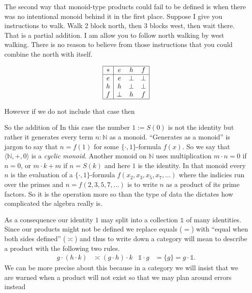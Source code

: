 \documentclass[12pt,twoside,letterpaper]{memoir}
\newcommand{\one}{\mathds{1}}
\begin{document}
The second way that monoid-type products could fail to be defined is when there 
was no intentional monoid behind it in the first place.  Suppose I give you instructions to walk.  Walk 2 block north, then 3 blocks west, then wait there.
That is a partial addition.  I am allow you to follow north walking by west walking.  There is no reason to believe from those instructions that you 
could combine the north with itself.


\begin{equation}
    \begin{array}{|c|ccc|}
        \hline 
        * & e & h & f\\
        \hline 
        e & e & \bot & \bot\\
        h & h & \bot & \bot \\
        f & \bot & h & f \\
        \hline
    \end{array}
\end{equation}



However if we do not include that case then 

So the addition of 
In this case 
the number $1:=S(0)$ is not the identity but rather it generates every term
$n:\mathbb{N}$ as a monoid.  ``Generates as a monoid'' is jargon to say that
$n=f(1)$ for some $\{\cdot,1\}$-formula $f(x)$.  So we say that $\langle
\mathbb{N},+,0\rangle$ is a \emph{cyclic monoid}. Another monoid on $\mathbb{N}$
uses multiplication $m\cdot n=0$ if $n=0$, or $m\cdot k+m$ if $n=S(k)$ and here
$1$ is the identity.  In that monoid every $n$ is the evaluation of a
$\{\cdot,1\}$-formula $f(x_2,x_3,x_5,x_7,\ldots)$ where the indicies run over
the primes and $n=f(2,3,5,7,\ldots)$ is to write $n$ as a product of its prime
factors.  So it is the operation more so than the type of data the dictates how
complicated the algebra really is.



As a consequence our identity $1$ may split into a 
collection $\one$ of many identities.  Since our products might not be defined 
we replace equals ($=$) with ``equal when both sides defined'' ($\asymp$)
and thus to write down a category will mean to describe a product 
with the following two rules.
\begin{align*}
    g\cdot (h\cdot k) & \asymp (g\cdot h)\cdot k 
    & 
    \one \cdot g & = \{g\} = g\cdot \one.
\end{align*}
We can be more precise about this because in a category we 
will insist that we are warned when a product will not exist 
so that we may plan around errors instead
\end{document}
